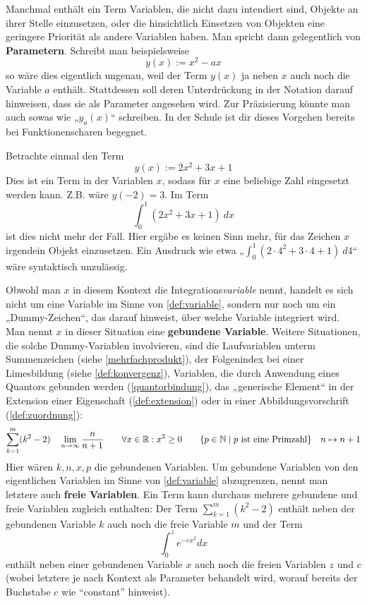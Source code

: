 \begin{bem}[* Parameter] 
    Manchmal enthält ein Term Variablen, die nicht dazu intendiert sind, Objekte an ihrer Stelle einzusetzen, oder die hinsichtlich Einsetzen von Objekten eine geringere Priorität als andere Variablen haben. Man spricht dann gelegentlich von \textbf{Parametern}. Schreibt man beispielsweise
        \[ y(x):=x^2-ax \]
    so wäre dies eigentlich ungenau, weil der Term $y(x)$ ja neben $x$ auch noch die Variable $a$ enthält. Stattdessen soll deren Unterdrückung in der Notation darauf hinweisen, dass sie als Parameter angesehen wird. Zur Präzisierung könnte man auch sowas wie „$y_a(x)$“ schreiben. In der Schule ist dir dieses Vorgehen bereits bei Funktionenscharen begegnet.
\end{bem}


\begin{nota} \label{gebundenevariable}  
    Betrachte einmal den Term
        \[ y(x):=2x^2+3x+1 \]
    Dies ist ein Term in der Variablen $x$, sodass für $x$ eine beliebige Zahl eingesetzt werden kann. Z.B. wäre $y(-2)=3$. Im Term
        \[ \int_0^1 (2x^2+3x+1)\ dx\]
    ist dies nicht mehr der Fall. Hier ergäbe es keinen Sinn mehr, für das Zeichen $x$ irgendein Objekt einzusetzen. Ein Ausdruck wie etwa „$\int_0^1 (2\cdot 4^2+3\cdot 4+1)\ d4$“ wäre syntaktisch unzulässig.

    Obwohl man $x$ in diesem Kontext die Integrations\emph{variable} nennt, handelt es sich nicht um eine Variable im Sinne von \cref{def:variable}, sondern nur noch um ein „Dummy-Zeichen“, das darauf hinweist, über welche Variable integriert wird. Man nennt $x$ in dieser Situation eine \textbf{gebundene Variable}. Weitere Situationen, die solche Dummy-Variablen involvieren, sind die Laufvariablen unterm Summenzeichen (siehe \cref{mehrfachprodukt}), der Folgenindex bei einer Limesbildung (siehe \cref{def:konvergenz}), Variablen, die durch Anwendung eines Quantors gebunden werden (\cref{quantorbindung}), das „generische Element“ in der Extension einer Eigenschaft (\cref{def:extension}) oder in einer Abbildungsvorschrift (\cref{def:zuordnung}):
        \[ \sum_{k=1}^m (k^2-2) \quad \lim_{n\to \infty} \frac{n}{n+1} \qquad \forall x\in\R: x^2\ge 0 \qquad \{p\in \N \mid p\ \text{ist eine Primzahl}\} \quad n\mapsto n+1 \]
    Hier wären $k,n,x,p$ die gebundenen Variablen. Um gebundene Variablen von den eigentlichen Variablen im Sinne von \cref{def:variable} abzugrenzen, nennt man letztere auch \textbf{freie Variablen}. Ein Term kann durchaus mehrere gebundene und freie Variablen zugleich enthalten: Der Term $\sum_{k=1}^m(k^2-2)$ enthält neben der gebundenen Variable $k$ auch noch die freie Variable $m$ und der Term
        \[ \int_0^z e^{-cx^2} dx \]
    enthält neben einer gebundenen Variable $x$ auch noch die freien Variablen $z$ und $c$ (wobei letztere je nach Kontext als Parameter behandelt wird, worauf bereits der Buchstabe $c$ wie ``constant'' hinweist).%
\end{nota}





